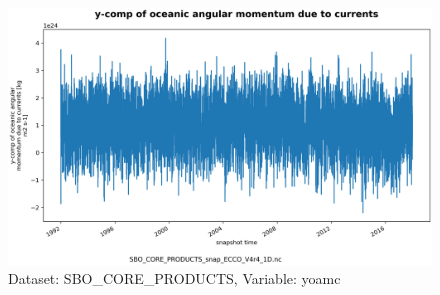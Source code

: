 \begin{figure}[H]
\centering
\includegraphics[scale=0.55]{../images/plots/oneD_plots/SBO_Core_Products/yoamc.png}
\caption{Dataset: SBO\_CORE\_PRODUCTS, Variable: yoamc}
\label{tab:table-SBO_CORE_PRODUCTS_yoamc-Plot}
\end{figure}
\newpage
\pagebreak
